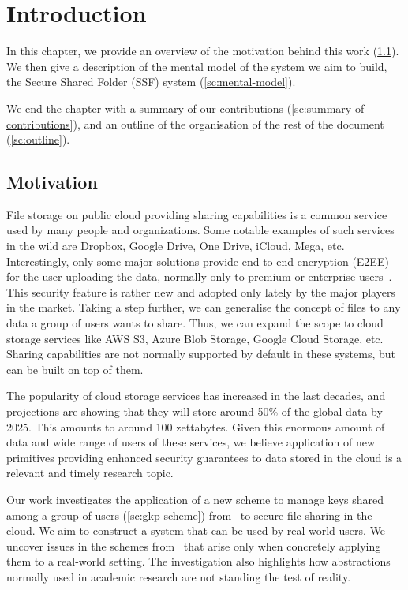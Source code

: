 \chapter{Introduction}
In this chapter, we provide an overview of the motivation
behind this work (\cref{intro-motivation}). 
We then give a
description of the mental model of the system we aim to build,
the Secure Shared Folder (SSF) system (\cref{sc:mental-model}).

We end the chapter with a summary of our contributions (\cref{sc:summary-of-contributions}),
and an outline of the organisation of the rest of the document (\cref{sc:outline}).

\section{Motivation}\label{intro-motivation}

File storage on public cloud providing sharing capabilities is a common service used by many people and organizations.
Some notable examples of such services in the wild are Dropbox, Google Drive, One Drive, iCloud, Mega, etc.
Interestingly, only some major solutions provide end-to-end encryption (E2EE) for the user uploading 
the data, normally only to premium or enterprise users~\cite{Dropbox,googleWorkspaceE2EE,Apple,Mega}.
This security feature is rather new and adopted only lately by the major players in the market.
Taking a step further, we can generalise the concept of files to any data a group of users wants to share.
Thus, we can expand the scope to cloud storage services like AWS S3, Azure Blob Storage, Google Cloud Storage, etc.
Sharing capabilities are not normally supported by default in these systems, but can be built on top of them.

The popularity of cloud storage services has increased in the last decades,
and projections are showing that they will store around 50\% of the global data by 2025.
This amounts to around 100 zettabytes\cite{SteveMorgan}.
Given this enormous amount of data and wide range of users of these services, 
we believe application of new primitives providing enhanced security guarantees
to data stored in the cloud is a relevant and timely research topic.

Our work investigates the application of a new scheme to
manage keys shared among a group of users (\cref{sc:gkp-scheme}) from~\cite{GKP} 
to secure file sharing in the cloud. We aim to construct
a system that can be used by real-world users.
We uncover issues in the schemes from~\cite{GKP}
that arise only when concretely applying them
to a real-world setting. The investigation also
highlights how abstractions normally used in academic
research are not standing the test of reality.

